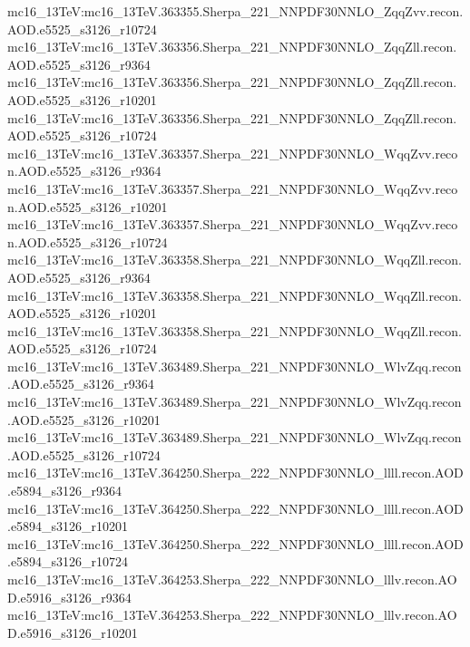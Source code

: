 { mc16\_13TeV:mc16\_13TeV.363355.Sherpa\_221\_NNPDF30NNLO\_ZqqZvv.recon.AOD.e5525\_s3126\_r10724\newline    
 mc16\_13TeV:mc16\_13TeV.363356.Sherpa\_221\_NNPDF30NNLO\_ZqqZll.recon.AOD.e5525\_s3126\_r9364\newline    
 mc16\_13TeV:mc16\_13TeV.363356.Sherpa\_221\_NNPDF30NNLO\_ZqqZll.recon.AOD.e5525\_s3126\_r10201\newline    
 mc16\_13TeV:mc16\_13TeV.363356.Sherpa\_221\_NNPDF30NNLO\_ZqqZll.recon.AOD.e5525\_s3126\_r10724\newline    
 mc16\_13TeV:mc16\_13TeV.363357.Sherpa\_221\_NNPDF30NNLO\_WqqZvv.recon.AOD.e5525\_s3126\_r9364\newline    
 mc16\_13TeV:mc16\_13TeV.363357.Sherpa\_221\_NNPDF30NNLO\_WqqZvv.recon.AOD.e5525\_s3126\_r10201\newline    
 mc16\_13TeV:mc16\_13TeV.363357.Sherpa\_221\_NNPDF30NNLO\_WqqZvv.recon.AOD.e5525\_s3126\_r10724\newline    
 mc16\_13TeV:mc16\_13TeV.363358.Sherpa\_221\_NNPDF30NNLO\_WqqZll.recon.AOD.e5525\_s3126\_r9364\newline    
 mc16\_13TeV:mc16\_13TeV.363358.Sherpa\_221\_NNPDF30NNLO\_WqqZll.recon.AOD.e5525\_s3126\_r10201\newline    
 mc16\_13TeV:mc16\_13TeV.363358.Sherpa\_221\_NNPDF30NNLO\_WqqZll.recon.AOD.e5525\_s3126\_r10724\newline    
 mc16\_13TeV:mc16\_13TeV.363489.Sherpa\_221\_NNPDF30NNLO\_WlvZqq.recon.AOD.e5525\_s3126\_r9364\newline    
 mc16\_13TeV:mc16\_13TeV.363489.Sherpa\_221\_NNPDF30NNLO\_WlvZqq.recon.AOD.e5525\_s3126\_r10201\newline    
 mc16\_13TeV:mc16\_13TeV.363489.Sherpa\_221\_NNPDF30NNLO\_WlvZqq.recon.AOD.e5525\_s3126\_r10724\newline    
 mc16\_13TeV:mc16\_13TeV.364250.Sherpa\_222\_NNPDF30NNLO\_llll.recon.AOD.e5894\_s3126\_r9364\newline    
 mc16\_13TeV:mc16\_13TeV.364250.Sherpa\_222\_NNPDF30NNLO\_llll.recon.AOD.e5894\_s3126\_r10201\newline    
 mc16\_13TeV:mc16\_13TeV.364250.Sherpa\_222\_NNPDF30NNLO\_llll.recon.AOD.e5894\_s3126\_r10724\newline    
 mc16\_13TeV:mc16\_13TeV.364253.Sherpa\_222\_NNPDF30NNLO\_lllv.recon.AOD.e5916\_s3126\_r9364\newline    
 mc16\_13TeV:mc16\_13TeV.364253.Sherpa\_222\_NNPDF30NNLO\_lllv.recon.AOD.e5916\_s3126\_r10201\newline    
}
